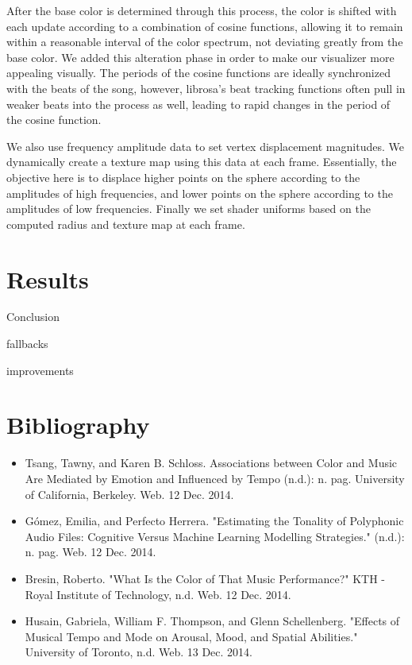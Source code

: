 \documentclass{article}
\begin{document}
After the base color is determined through this process, the color is shifted with each update according to a combination of cosine functions, allowing it to remain within a reasonable interval of the color spectrum, not deviating greatly from the base color. We added this alteration phase in order to make our visualizer more appealing visually. The periods of the cosine functions are ideally synchronized with the beats of the song, however, librosa's beat tracking functions often pull in weaker beats into the process as well, leading to rapid changes in the period of the cosine function.


We also use frequency amplitude data to set vertex displacement magnitudes. We dynamically create a texture map using this data at each frame. Essentially, the objective here is to displace higher points on the sphere according to the amplitudes of high frequencies, and lower points on the sphere according to the amplitudes of low frequencies. Finally we set shader uniforms based on the computed radius and texture map at each frame.

\section{Results}

Conclusion

fallbacks

improvements

\section{Bibliography}

\begin{itemize}
    \item Tsang, Tawny, and Karen B. Schloss. Associations between Color and Music Are Mediated by Emotion and Influenced by Tempo (n.d.): n. pag. University of California, Berkeley. Web. 12 Dec. 2014.
    \item Gómez, Emilia, and Perfecto Herrera. "Estimating the Tonality of Polyphonic Audio Files: Cognitive Versus Machine Learning Modelling Strategies." (n.d.): n. pag. Web. 12 Dec. 2014.
    \item Bresin, Roberto. "What Is the Color of That Music Performance?" KTH - Royal Institute of Technology, n.d. Web. 12 Dec. 2014.
    \item Husain, Gabriela, William F. Thompson, and Glenn Schellenberg. "Effects of Musical Tempo and Mode on Arousal, Mood, and Spatial Abilities." University of Toronto, n.d. Web. 13 Dec. 2014.
\end{itemize}
\end{document}
